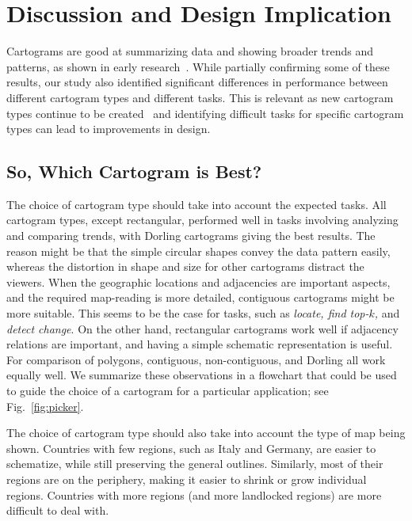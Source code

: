 \documentclass[10pt,journal,compsoc]{IEEEtran}
\begin{document}
\section{Discussion and Design Implication}


Cartograms are good at summarizing data and showing broader trends and patterns, as shown in early research~\cite{Krauss_ms, Hui}. While partially confirming some of these results, our study also identified significant differences in performance between different cartogram types and different tasks. This is relevant as new cartogram types continue to be created~\cite{cano2015mosaic} and identifying difficult tasks for specific cartogram types can lead to improvements in design.



\subsection{So, Which Cartogram is Best?}


The choice of cartogram type should take into account the expected tasks.
All cartogram types, except rectangular, performed well in tasks involving analyzing and comparing trends, with Dorling cartograms giving the best results. The reason might be that the simple circular shapes convey the data pattern easily, whereas the distortion in shape and size for other cartograms distract the viewers. 
When the geographic locations and adjacencies are important aspects, and the required map-reading  is more detailed, contiguous cartograms might be more suitable. This seems to be the case for tasks, such as \textit{locate, find top-$k$,} and \textit{detect change}.
On the other hand,  rectangular cartograms work well if adjacency relations are important, and having a simple schematic representation is useful. For comparison of polygons, contiguous, non-contiguous, and Dorling all work equally well. 
We summarize these observations in a flowchart that could be used to guide the choice of a cartogram for a particular application; see Fig.~\ref{fig:picker}.




The choice of cartogram type should also take into account the type of map being shown. Countries with few regions, such as Italy and Germany, are easier to schematize, while still preserving the general outlines. Similarly, most of their regions are on the periphery, making it easier to shrink or grow individual regions. Countries with more regions (and more landlocked regions) are more difficult to deal with. 
\end{document}
